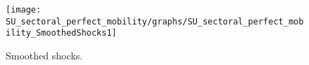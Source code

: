  
\begin{figure}[H]
\centering 
\texttt{[image: SU\_sectoral\_perfect\_mobility/graphs/SU\_sectoral\_perfect\_mobility\_SmoothedShocks1]}
\caption{Smoothed shocks.}\label{Fig:SmoothedShocks:1}
\end{figure}


